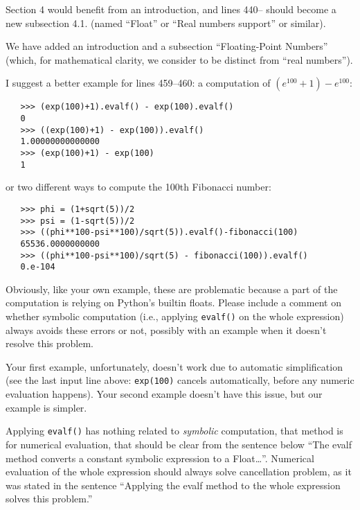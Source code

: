 \documentclass[answers,12pt]{exam}
\begin{document}
\begin{questions}
\question Section 4 would benefit from an introduction, and lines 440-- should become a new subsection 4.1. (named ``Float'' or ``Real numbers support'' or similar).
\begin{solution}
We have added an introduction and a subsection ``Floating-Point Numbers''
(which, for mathematical clarity, we consider to be distinct from ``real
numbers'').
\end{solution}

\question I suggest a better example for lines 459--460: a computation of $(e^{100} +1)− e^{100}$:

\begin{verbatim}
   >>> (exp(100)+1).evalf() - exp(100).evalf()
   0
   >>> ((exp(100)+1) - exp(100)).evalf()
   1.00000000000000
   >>> (exp(100)+1) - exp(100)
   1
\end{verbatim}

or two different ways to compute the 100th Fibonacci number:

\begin{verbatim}
   >>> phi = (1+sqrt(5))/2
   >>> psi = (1-sqrt(5))/2
   >>> ((phi**100-psi**100)/sqrt(5)).evalf()-fibonacci(100)
   65536.0000000000
   >>> ((phi**100-psi**100)/sqrt(5) - fibonacci(100)).evalf()
   0.e-104
\end{verbatim}

Obviously, like your own example, these are problematic because a part of the computation is relying on Python's builtin floats. Please include a comment on whether symbolic computation (i.e., applying \texttt{evalf()} on the whole expression) always avoids these errors or not, possibly with an example when it doesn't resolve this problem.
\begin{solution}
  Your first example, unfortunately, doesn't work due to automatic
  simplification (see the last input line above:  \texttt{exp(100)} cancels
  automatically, before any numeric evaluation happens). Your second example
  doesn't have this issue, but our example is simpler.

Applying \texttt{evalf()} has nothing related to \emph{symbolic} computation,
that method is for numerical evaluation, that should be clear from
the sentence below ``The evalf method converts a constant symbolic expression
to a Float\dots''.  Numerical evaluation of the whole expression should
always solve cancellation problem, as it was stated in the sentence
``Applying the evalf method to the whole expression solves this problem.''
\end{solution}


\end{questions}
\end{document}
